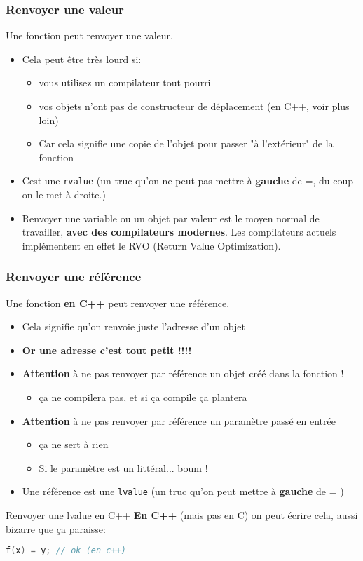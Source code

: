 \documentclass{beamer}
\begin{document}
\begin{frame}[fragile=singleslide,shrink=20]
\frametitle{Renvoyer une valeur}
Une fonction peut renvoyer une valeur.
\begin{itemize}
\item{Cela peut être très lourd si:
\begin{itemize}
\item{vous utilisez un compilateur tout pourri}
\item{vos objets n'ont pas de constructeur de déplacement (en C++, voir plus loin)}
\item{Car cela signifie une copie de l'objet pour passer "à l'extérieur" de la fonction}
\end{itemize}}
\item{Cest une \texttt{rvalue} (un truc qu'on ne peut pas mettre à \textbf{gauche} de =, du coup on le met à droite.) }
\item Renvoyer une variable ou un objet par valeur est le moyen normal de travailler, \textbf{avec des compilateurs modernes}. Les
compilateurs actuels implémentent en effet le RVO (Return Value Optimization).
\end{itemize}

\end{frame}

\begin{frame}[fragile=singleslide,shrink=20]
\frametitle{Renvoyer une référence}
Une fonction \textbf{en C++} peut renvoyer une référence.
\begin{itemize}
\item{Cela signifie qu'on renvoie juste l'adresse d'un objet}
\item{\textbf{Or une adresse c'est tout petit !!!!}}
\item{\textbf{Attention} à ne pas renvoyer par référence un objet créé dans la fonction !}
\begin{itemize}
\item{ça ne compilera pas, et si ça compile ça plantera}
\end{itemize}
\item{\textbf{Attention} à ne pas renvoyer par référence un paramètre passé en entrée}
\begin{itemize}
\item{ça ne sert à rien}
\item{Si le paramètre est un littéral... boum !}
\end{itemize}
\item Une référence est une \texttt{lvalue} (un truc qu'on peut mettre à \textbf{gauche} de = )
\end{itemize}

\begin{block}{Renvoyer une lvalue en C++}
\textbf{En C++} (mais pas en C) on peut écrire cela, aussi bizarre que ça paraisse:
\begin{lstlisting}[language=c++]
f(x) = y; // ok (en c++)
\end{lstlisting}
\end{block}
\end{frame}
\end{document}
